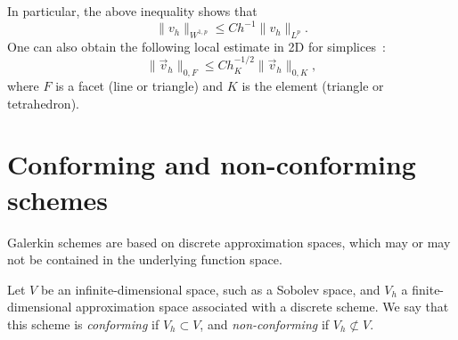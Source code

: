 In particular, the above inequality shows that
\begin{equation*}
    \| v_h \|_{W^{1,p}} \leq C h^{-1} \| v_h \|_{L^p}.
\end{equation*}
One can also obtain the following local estimate in 2D for simplices~\cite{warburton2003constants}:
\begin{equation}
    \| \vec v_h \|_{0,F} \leq C h_K^{-1/2} \| \vec v_h \|_{0,K},
\end{equation}
where $F$ is a facet (line or triangle) and $K$ is the element (triangle or tetrahedron).

\section{Conforming and non-conforming schemes} 
Galerkin schemes are based on discrete approximation spaces, which may or may not be contained in the underlying function space.
\begin{definition}\label{def:conforming-scheme}
    Let $V$ be an infinite-dimensional space, such as a Sobolev space, and $V_h$ a finite-dimensional approximation space associated with a discrete scheme. We say that this scheme is \emph{conforming} if $V_h\subset V$, and \emph{non-conforming} if $V_h\not\subset V$. 
\end{definition}

